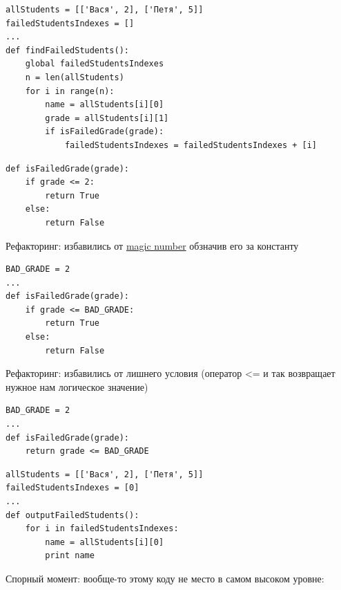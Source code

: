 {\begin{frame}[fragile]
  \begin{verbatim}
allStudents = [['Вася', 2], ['Петя', 5]]
failedStudentsIndexes = []
...
def findFailedStudents():
    global failedStudentsIndexes
    n = len(allStudents)
    for i in range(n):
        name = allStudents[i][0]
        grade = allStudents[i][1]
        if isFailedGrade(grade):
            failedStudentsIndexes = failedStudentsIndexes + [i]
  \end{verbatim}
\end{frame}

\begin{frame}[fragile]
  \begin{verbatim}
def isFailedGrade(grade):
    if grade <= 2:
        return True
    else:
        return False
  \end{verbatim}
\end{frame}

\begin{frame}[fragile]
  Рефакторинг: избавились от \underline{magic number} обзначив его за константу
  \vspace{1cm}
  \begin{verbatim}
BAD_GRADE = 2
...
def isFailedGrade(grade):
    if grade <= BAD_GRADE:
        return True
    else:
        return False
  \end{verbatim}
\end{frame}

\begin{frame}[fragile]
  Рефакторинг: избавились от лишнего условия (оператор <= и так возвращает нужное нам логическое значение)
  \vspace{1cm}
  \begin{verbatim}
BAD_GRADE = 2
...
def isFailedGrade(grade):
    return grade <= BAD_GRADE
  \end{verbatim}
\end{frame}

\begin{frame}[fragile]
  \begin{verbatim}
allStudents = [['Вася', 2], ['Петя', 5]]
failedStudentsIndexes = [0]
...
def outputFailedStudents():
    for i in failedStudentsIndexes:
        name = allStudents[i][0]
        print name
  \end{verbatim}
\end{frame}

\begin{frame}[fragile]
  Спорный момент: вообще-то этому коду не место в самом высоком уровне:


\end{frame}}

